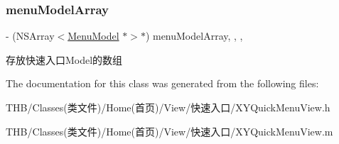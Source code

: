 \subsubsection{\texorpdfstring{menu\+Model\+Array}{menuModelArray}}
{\footnotesize\ttfamily -\/ (N\+S\+Array$<$\mbox{\hyperlink{interface_menu_model}{Menu\+Model}} $\ast$$>$$\ast$) menu\+Model\+Array\hspace{0.3cm}{\ttfamily [read]}, {\ttfamily [write]}, {\ttfamily [nonatomic]}, {\ttfamily [strong]}}

存放快速入口\+Model的数组 

The documentation for this class was generated from the following files\+:\begin{DoxyCompactItemize}
\item 
T\+H\+B/\+Classes(类文件)/\+Home(首页)/\+View/快速入口/X\+Y\+Quick\+Menu\+View.\+h\item 
T\+H\+B/\+Classes(类文件)/\+Home(首页)/\+View/快速入口/X\+Y\+Quick\+Menu\+View.\+m\end{DoxyCompactItemize}
